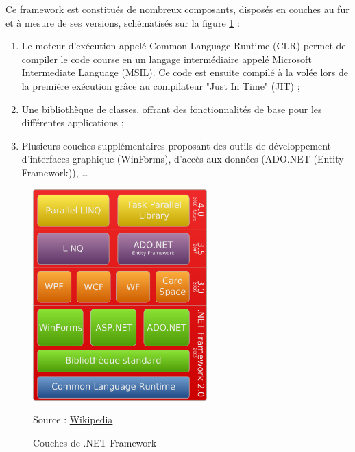 Ce framework est constitués de nombreux composants, disposés en couches au fur et à mesure de ses versions, schématisés sur la figure \ref{NET_Framework} :
\begin{enumerate}
	\item Le moteur d'exécution appelé Common Language Runtime (CLR) permet de compiler le code course en un langage intermédiaire appelé Microsoft Intermediate Language (MSIL).
Ce code est ensuite compilé à la volée lors de la première exécution grâce au compilateur "Just In Time" (JIT) ;
	\item Une bibliothèque de classes, offrant des fonctionnalités de base pour les différentes applications ;
	\item Plusieurs couches supplémentaires proposant des outils de développement d'interfaces graphique (WinForms), d'accès aux données (ADO.NET (Entity Framework)), \ldots
\end{enumerate}
\begin{figure}[!h]
	\center
	\includegraphics[width=0.6\textwidth]{img/NET_Framework.png}
	\caption{Couches de .NET Framework}
	Source : \href{http://fr.wikipedia.org/wiki/Framework\_.NET}{Wikipedia}
	\label{NET_Framework}
\end{figure}

